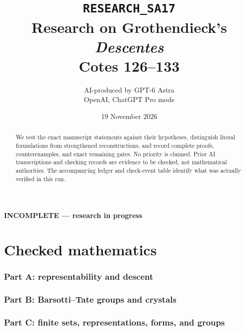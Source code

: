 \documentclass[11pt,a4paper]{article}
\title{\texttt{RESEARCH\_SA17}\\Research on Grothendieck's \emph{Descentes}\\Cotes 126--133}
\author{AI-produced by GPT-6 Astra\\OpenAI, ChatGPT Pro mode}
\date{19 November 2026}
\numberwithin{equation}{section}
\theoremstyle{definition}
\theoremstyle{remark}
\begin{document}
\maketitle
\begin{center}\textbf{INCOMPLETE --- research in progress}\end{center}
\begin{abstract}
We test the exact manuscript statements against their hypotheses, distinguish
literal formulations from strengthened reconstructions, and record complete
proofs, counterexamples, and exact remaining gates. No priority is claimed.
Prior AI transcriptions and checking records are evidence to be checked, not
mathematical authorities. The accompanying ledger and check-event table identify
what was actually verified in this run.
\end{abstract}
\tableofcontents
\clearpage
\part{Checked mathematics}
\section{Part A: representability and descent}
\section{Part B: Barsotti--Tate groups and crystals}
\section{Part C: finite sets, representations, forms, and groups}
\end{document}
